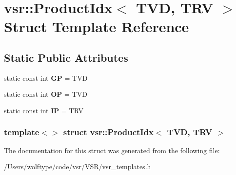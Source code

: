 \hypertarget{structvsr_1_1_product_idx_3_01_t_v_d_00_01_t_r_v_01_4}{\section{vsr\-:\-:Product\-Idx$<$ T\-V\-D, T\-R\-V $>$ Struct Template Reference}
\label{structvsr_1_1_product_idx_3_01_t_v_d_00_01_t_r_v_01_4}
}
\subsection*{Static Public Attributes}
\begin{DoxyCompactItemize}
\item 
\hypertarget{structvsr_1_1_product_idx_3_01_t_v_d_00_01_t_r_v_01_4_a905e4edc9530db9584d71759d8ec65df}{static const int {\bfseries G\-P} = T\-V\-D}\label{structvsr_1_1_product_idx_3_01_t_v_d_00_01_t_r_v_01_4_a905e4edc9530db9584d71759d8ec65df}

\item 
\hypertarget{structvsr_1_1_product_idx_3_01_t_v_d_00_01_t_r_v_01_4_ab5ba52c869e0f161290fb4aee86551ab}{static const int {\bfseries O\-P} = T\-V\-D}\label{structvsr_1_1_product_idx_3_01_t_v_d_00_01_t_r_v_01_4_ab5ba52c869e0f161290fb4aee86551ab}

\item 
\hypertarget{structvsr_1_1_product_idx_3_01_t_v_d_00_01_t_r_v_01_4_a8ab01652dc1fd25029dc9bce3733933f}{static const int {\bfseries I\-P} = T\-R\-V}\label{structvsr_1_1_product_idx_3_01_t_v_d_00_01_t_r_v_01_4_a8ab01652dc1fd25029dc9bce3733933f}

\end{DoxyCompactItemize}
\subsubsection*{template$<$$>$ struct vsr\-::\-Product\-Idx$<$ T\-V\-D, T\-R\-V $>$}



The documentation for this struct was generated from the following file\-:\begin{DoxyCompactItemize}
\item 
/\-Users/wolftype/code/vsr/\-V\-S\-R/vsr\-\_\-templates.\-h\end{DoxyCompactItemize}

